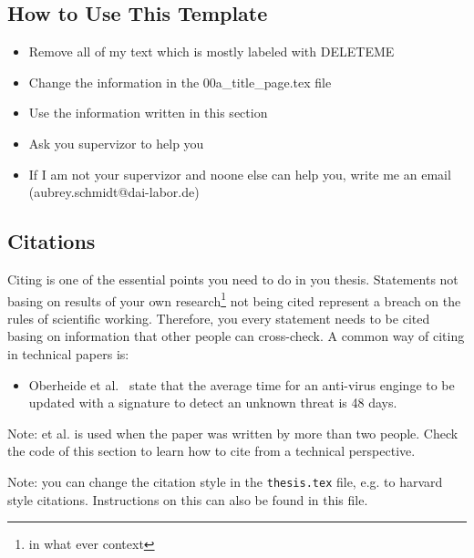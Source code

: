 \subsection*{How to Use This Template}
\begin{itemize}
\item Remove all of my text which is mostly labeled with DELETEME
\item Change the information in the 00a\_title\_page.tex file
\item Use the information written in this section
\item Ask you supervizor to help you
\item If I am not your supervizor and noone else can help you, write me an email (aubrey.schmidt@dai-labor.de)
\end{itemize}

\subsection*{Citations}
Citing is one of the essential points you need to do in you thesis. Statements not basing on results of your own research\footnote{in what ever context} not being cited represent a breach on the rules of scientific working. Therefore, you every statement needs to be cited basing on information that other people can cross-check. A common way of citing in technical papers is: 
\begin{itemize}
\item Oberheide et al.~\cite{oberheide:2008:cloudav} state that the average time for an anti-virus enginge to be updated with a signature to detect an unknown threat is 48 days.
\end{itemize}
Note: et al. is used when the paper was written by more than two people. Check the code of this section to learn how to cite from a technical perspective.

Note: you can change the citation style in the \texttt{thesis.tex} file, e.g. to harvard style citations. Instructions on this can also be found in this file.


